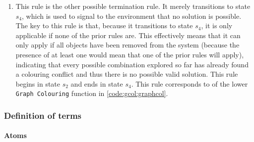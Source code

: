 \begin{enumerate}
\item This rule is the other possible termination rule.  It merely transitions to state \(s_4\), which is used to signal to the environment that no solution is possible.  The key to this rule is that, because it transitions to state \(s_4\), it is only applicable if none of the prior rules are.  This effectively means that it can only apply if all \bo{} objects have been removed from the system (because the presence of at least one \bo{} would mean that one of the prior rules will apply), indicating that every possible combination explored so far has already found a colouring conflict and thus there is no possible valid solution.  This rule begins in state \(s_2\) and ends in state \(s_4\).  This rule corresponds to  of the lower \texttt{Graph Colouring} function in \cref{code:gcol:graphcol}.

\end{enumerate}

\subsubsection{Definition of terms}
\paragraph{Atoms}
\begin{description}
\end{description}

